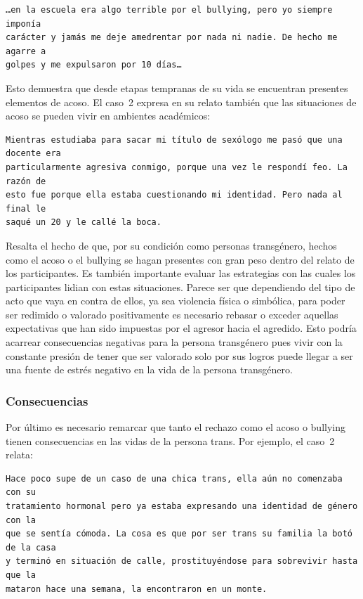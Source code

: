 \begin{verbatim}
…en la escuela era algo terrible por el bullying, pero yo siempre imponía
carácter y jamás me deje amedrentar por nada ni nadie. De hecho me agarre a
golpes y me expulsaron por 10 días…
\end{verbatim}

Esto demuestra que desde etapas tempranas de su vida se encuentran presentes
elementos de acoso. El caso~2 expresa en su relato también que las situaciones
de acoso se pueden vivir en ambientes académicos:

\begin{verbatim}
Mientras estudiaba para sacar mi título de sexólogo me pasó que una docente era
particularmente agresiva conmigo, porque una vez le respondí feo. La razón de
esto fue porque ella estaba cuestionando mi identidad. Pero nada al final le
saqué un 20 y le callé la boca.
\end{verbatim}

Resalta el hecho de que, por su condición como personas transgénero, hechos como
el acoso o el bullying se hagan presentes con gran peso dentro del relato de los
participantes. Es también importante evaluar las estrategias con las cuales los
participantes lidian con estas situaciones. Parece ser que dependiendo del tipo
de acto que vaya en contra de ellos, ya sea violencia física o simbólica, para
poder ser redimido o valorado positivamente es necesario rebasar o exceder
aquellas expectativas que han sido impuestas por el agresor hacia el agredido.
Esto podría acarrear consecuencias negativas para la persona transgénero pues
vivir con la constante presión de tener que ser valorado solo por sus logros
puede llegar a ser una fuente de estrés negativo en la vida de la persona
transgénero.

\subsubsection{Consecuencias}

Por último es necesario remarcar que tanto el rechazo como el acoso o bullying
tienen consecuencias en las vidas de la persona trans. Por ejemplo, el caso~2
relata:

\begin{verbatim}
Hace poco supe de un caso de una chica trans, ella aún no comenzaba con su
tratamiento hormonal pero ya estaba expresando una identidad de género con la
que se sentía cómoda. La cosa es que por ser trans su familia la botó de la casa
y terminó en situación de calle, prostituyéndose para sobrevivir hasta que la
mataron hace una semana, la encontraron en un monte.
\end{verbatim}

